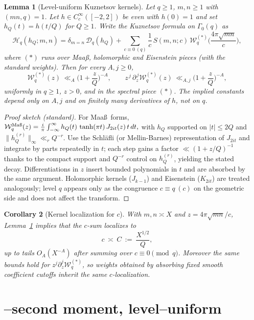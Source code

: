 \documentclass[11pt]{article}
\newtheorem{lemma}{Lemma}[part]
\newtheorem{corollary}[lemma]{Corollary}
\theoremstyle{definition}
\theoremstyle{remark}
\numberwithin{equation}{part}
\begin{document}
\begin{lemma}[Level-uniform Kuznetsov kernels]\label{lem:kuznetsov-uniform}
	Let $q\ge1$, $m,n\ge1$ with $(mn,q)=1$.
	Let $h\in C_c^\infty([-2,2])$ be even with $h(0)=1$ and set $h_Q(t)=h(t/Q)$ for $Q\ge1$.
	Write the Kuznetsov formula on $\Gamma_0(q)$ as
	\[
		\mathcal H_q(h_Q;m,n)
		=\delta_{m=n}\,\mathcal D_q(h_Q)
		+\sum_{c\equiv 0\ (q)} \frac{1}{c}\,S(m,n;c)\,\mathcal W_q^{(*)}\!\Big(\frac{4\pi\sqrt{mn}}{c}\Big),
	\]
	where $(*)$ runs over Maa\ss, holomorphic and Eisenstein pieces (with the standard weights).
	Then for every $A,j\ge0$,
	\[
		\mathcal W_q^{(*)}(z)\ \ll_A \Big(1+\frac{z}{Q}\Big)^{-A},
		\qquad
		z^{\,j}\,\partial_z^{\,j}\mathcal W_q^{(*)}(z)\ \ll_{A,j} \Big(1+\frac{z}{Q}\Big)^{-A},
	\]
	uniformly in $q\ge1$, $z>0$, and in the spectral piece $(*)$.
	The implied constants depend only on $A,j$ and on finitely many derivatives of $h$, not on $q$.
\end{lemma}

\begin{proof}[Proof sketch (standard)]
	For Maa\ss\ forms,
	\(
	\mathcal W_q^{\mathrm{Ma\text\ss}}(z)=\frac{i}{\pi}\int_{-\infty}^{\infty} h_Q(t)\,\tanh(\pi t)\,J_{2it}(z)\,t\,dt,
	\)
	with $h_Q$ supported on $|t|\le 2Q$ and $\|h_Q^{(r)}\|_\infty\ll_r Q^{-r}$.
	Use the Schl\"afli (or Mellin-Barnes) representation of $J_{2it}$ and integrate by parts repeatedly in $t$;
	each step gains a factor $\ll (1+z/Q)^{-1}$ thanks to the compact support and $Q^{-r}$ control on $h_Q^{(r)}$,
	yielding the stated decay. Differentiations in $z$ insert bounded polynomials in $t$ and are absorbed by the same argument.
	Holomorphic kernels ($J_{k-1}$) and Eisenstein ($K_{2it}$) are treated analogously; level $q$ appears only as the congruence $c\equiv q\ (c)$ on the geometric side and does not affect the transform.
\end{proof}

\begin{corollary}[Kernel localization for $c$]\label{cor:kernel-localization}
	With $m,n\asymp X$ and $z=4\pi\sqrt{mn}/c$, Lemma~\ref{lem:kuznetsov-uniform} implies that the $c$-sum localizes to
	\[
		c\ \asymp\ C\ :=\ \frac{X^{1/2}}{Q},
	\]
	up to tails $O_A(X^{-A})$ after summing over $c\equiv0\pmod q$.
	Moreover the same bounds hold for $z^j\partial_z^j\mathcal W_q^{(*)}$, so weights obtained by absorbing fixed smooth coefficient cutoffs inherit the same $c$-localization.
\end{corollary}


\section{\textbf\textDelta--second moment, level--uniform}
\end{document}
